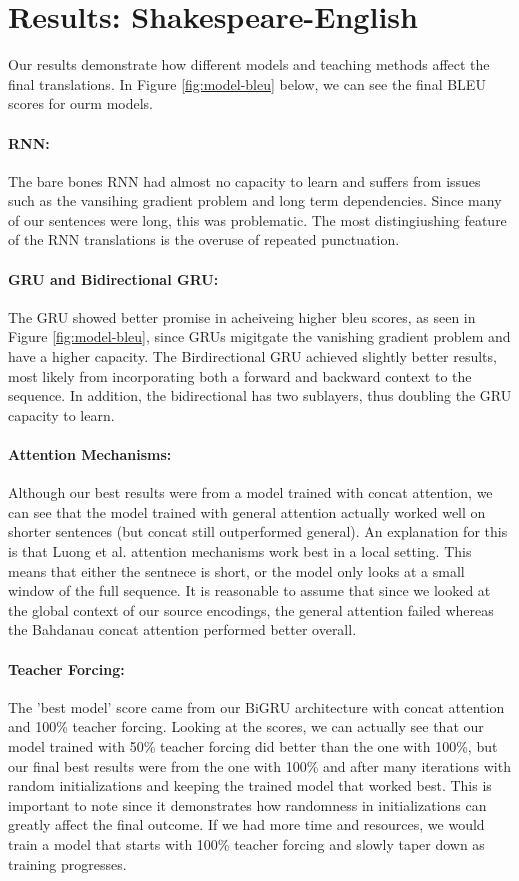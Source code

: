 \documentclass[twoside,twocolumn]{article}
\begin{document}
\section{Results: Shakespeare-English}
\label{sec:results}
Our results demonstrate how different models and teaching methods affect the
final translations. In Figure \ref{fig:model-bleu} below, we can see the
final BLEU scores for ourm models.
\paragraph{RNN:}
The bare bones RNN had almost no capacity to learn and suffers from issues
such as the vansihing gradient problem and long term dependencies. Since many
of our sentences were long, this was problematic. The most distingiushing
feature of the RNN translations is the overuse of repeated punctuation.
\paragraph{GRU and Bidirectional GRU:}
The GRU showed better promise in acheiveing higher bleu scores, as seen in
Figure \ref{fig:model-bleu}, since GRUs migitgate the vanishing gradient
problem and have a higher capacity.
The Birdirectional GRU achieved slightly better results, most likely from
incorporating both a forward and backward context to the sequence. In addition,
the bidirectional has two sublayers, thus doubling the GRU capacity to learn.
\paragraph{Attention Mechanisms:}
Although our best results were from a model trained with concat attention, we
can see that the model trained with general attention actually worked well on
shorter sentences (but concat still outperformed general).
An explanation for this is that Luong et al.
\cite{luong2015effective} attention mechanisms work best in a local setting.
This means that either the sentnece is short, or the model only looks at a
small window of the full sequence. It is reasonable to assume that since we
looked at the global context of our source encodings, the general attention
failed whereas the Bahdanau \cite{bahdanau2014neural} concat attention
performed better overall.
\paragraph{Teacher Forcing:}
The 'best model' score came from our BiGRU architecture with concat attention
and 100\% teacher forcing. Looking at the scores, we can actually see that our
model trained with 50\% teacher forcing did better than the one with 100\%, but
our final best results were from the one with 100\% and after many iterations
with random initializations and keeping the trained model that worked best.
This is important to note since it demonstrates how randomness in
initializations can greatly affect the final outcome. If we had more time and
resources, we would train a model that starts with 100\% teacher forcing and
slowly taper down as training progresses.
\end{document}

